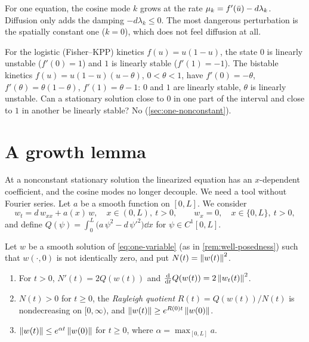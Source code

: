 \begin{keyidea}
For one equation, the cosine mode $k$ grows at the rate $\mu_k=f'(\bar u)-d\lambda_k$.
Diffusion only adds the damping $-d\lambda_k\le0$. The most dangerous perturbation is
the spatially constant one ($k=0$), which does not feel diffusion at all.
\end{keyidea}

\begin{example}\label{ex:one-kinetics}
For the logistic (Fisher--KPP) kinetics $f(u)=u(1-u)$, the state $0$ is linearly
unstable ($f'(0)=1$) and $1$ is linearly stable ($f'(1)=-1$). The bistable kinetics
$f(u)=u(1-u)(u-\theta)$, $0<\theta<1$, have $f'(0)=-\theta$,
$f'(\theta)=\theta(1-\theta)$, $f'(1)=\theta-1$: $0$ and $1$ are linearly stable,
$\theta$ is linearly unstable. Can a stationary solution close to $0$ in one part of the
interval and close to $1$ in another be linearly stable? No (\cref{sec:one-nonconstant}).
\end{example}

\section{A growth lemma}\label{sec:one-growth}

At a nonconstant stationary solution the linearized equation has an $x$-dependent
coefficient, and the cosine modes no longer decouple. We need a tool without Fourier
series. Let $a$ be a smooth function on $[0,L]$. We consider
\begin{equation}\label{eq:one-variable}
  w_t = d\,w_{xx} + a(x)\,w,\quad x\in(0,L),\ t>0,\qquad
  w_x=0,\quad x\in\{0,L\},\ t>0 ,
\end{equation}
and define $Q(\psi) = \int_0^L \big(a\,\psi^2 - d\,\psi'^2\big)\dd x$ for
$\psi\in C^1[0,L]$.

\begin{lemma}\label{lem:rayleigh-growth}
Let $w$ be a smooth solution of \eqref{eq:one-variable} (as in
\cref{rem:well-posedness}) such that $w(\cdot,0)$ is not identically zero, and put
$N(t)=\left\lVert w(t)\right\rVert^2$.
\begin{enumerate}[label=(\alph*)]
  \item For $t>0$, $N'(t)=2Q(w(t))$ and $\frac{\mathrm d}{\mathrm dt}Q(w(t)) = 2\left\lVert w_t(t)\right\rVert^2$.
  \item $N(t)>0$ for $t\ge0$, the \emph{Rayleigh quotient} $R(t)=Q(w(t))/N(t)$ is
        nondecreasing on $[0,\infty)$, and $\left\lVert w(t)\right\rVert\ge e^{R(0)t}\left\lVert w(0)\right\rVert$.
  \item $\left\lVert w(t)\right\rVert\le e^{\alpha t}\left\lVert w(0)\right\rVert$ for $t\ge0$, where $\alpha=\max_{[0,L]}a$.
\end{enumerate}
\end{lemma}


